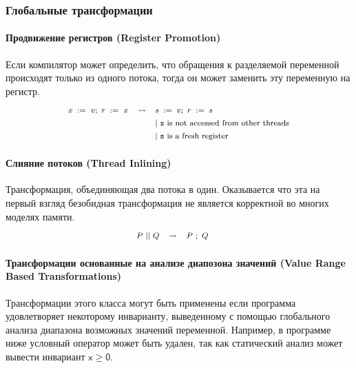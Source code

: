\subsubsection{Глобальные трансформации}

\paragraph{
Продвижение регистров
(Register Promotion)
}

Если компилятор может определить, что 
обращения к разделяемой переменной 
происходят только из одного потока,
тогда он может заменить эту переменную на регистр.
%
\[\def\arraystretch{1.4}\footnotesize
  \begin{array}{ccl} 

      \writeInst{}{x}{v} \seq \readInst{}{r}{x} 
    & \leadsto 
    & \assignInst{s}{v} \seq \assignInst{r}{s}
    \\ 
    
    & & |~ \text{\texttt{x} is not accessed from other threads} \\
    & & |~ \text{\texttt{s} is a fresh register} \\ 

  \end{array}
\]

\paragraph{Слияние потоков (Thread Inlining)}

Трансформация, объединяющая два потока в один.
Оказывается что эта на первый взгляд безобидная
трансформация не является корректной во многих моделях памяти. 
%
\[\def\arraystretch{1.4}\footnotesize
  \begin{array}{cccl} 

      P \pll Q 
    & \leadsto 
    & P ~\seq Q
    & ~ \\ 
    
  \end{array}
\]


\paragraph{
Трансформации основанные на анализе диапозона значений
(Value Range Based Transformations)
}

Трансформации этого класса могут быть применены
если программа удовлетворяет некоторому инварианту,
выведенному с помощью глобального анализа 
диапазона возможных значений переменной.
Например, в программе ниже условный оператор
может быть удален, так как статический 
анализ может вывести инвариант 
$\mathsf{x} \geq \mathsf{0}$.


